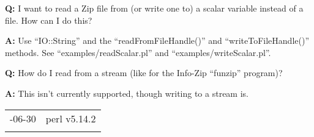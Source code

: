 \documentclass[]{article}
\let\realtextbf=\textbf
\renewcommand{\textbf}[1]{\textcolor{boldcolor}{\realtextbf{#1}}}
\begin{document}
\textbf{Q:} I want to read a Zip file from (or write one to) a scalar
variable instead of a file. How can I do this?

\textbf{A:} Use ``IO::String'' and the ``readFromFileHandle()'' and
``writeToFileHandle()'' methods. See ``examples/readScalar.pl'' and
``examples/writeScalar.pl''.


\textbf{Q:} How do I read from a stream (like for the Info-Zip
``funzip'' program)?

\textbf{A:} This isn't currently supported, though writing to a stream
is.

\begin{longtable}[c]{@{}ll@{}}
\toprule\addlinespace
2009-06-30 & perl v5.14.2
\\\addlinespace
\bottomrule
\end{longtable}
\end{document}
